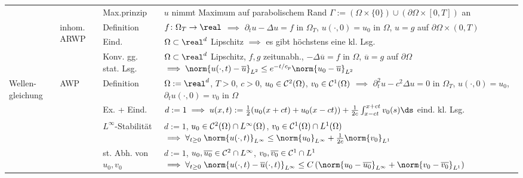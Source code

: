 \begin{landscape}
\begin{tabular}{p{20mm}p{20mm}p{30mm}p{169mm}}
        &&Max.prinzip&
        $u$ nimmt Maximum auf parabolischem Rand
        $\Gamma := (\Omega \times \{0\}) \cup (\partial\Omega \times [0, T])$ an\\

        \cmidrule{2-4}

        &\multirow{3}{20mm}{inhom. ARWP}&
        Definition&
        $f\colon \Omega_T \to \real$
        $\implies$
        $\partial_t u - \Delta u = f$ in $\Omega_T$,
        $u(\cdot, 0) = u_0$ in $\Omega$,
        $u = g$ auf $\partial\Omega \times (0, T)$\\

        &&Eind.&
        $\Omega \subset \real^d$ Lipschitz
        $\implies$ es gibt höchstens eine kl. Lsg.\\

        &&Konv. gg. stat. Lsg.&
        $\Omega \subset \real^d$ Lipschitz,
        $f, g$ zeitunabh.,
        $-\Delta\overline{u} = f$ in $\Omega$, $\overline{u} = g$ auf $\partial\Omega$
        $\implies \norm{u(\cdot, t) - \overline{u}}_{L^2} \le
        e^{-t/c_p} \norm{u_0 - \overline{u}}_{L^2}$\\

        \midrule

        \multirow{8}{20mm}{Wellen-gleichung}&
        \multirow{5}{20mm}{AWP}&
        Definition&
        $\Omega := \real^d$, $T > 0$, $c > 0$, $u_0 \in \mathcal{C}^2(\Omega)$, $v_0 \in \mathcal{C}^1(\Omega)$
        $\implies$
        $\partial_t^2 u - c^2 \Delta u = 0$ in $\Omega_T$, $u(\cdot, 0) = u_0$,
        $\partial_t u(\cdot, 0) = v_0$ in $\Omega$\\

        &&Ex. + Eind.&
        $d := 1 \implies u(x, t) :=
        \frac{1}{2} (u_0(x+ct) + u_0(x-ct)) + \frac{1}{2c} \int_{x-ct}^{x+ct} v_0(s)\ds$
        eind. kl. Lsg.\\

        &&$L^\infty$-Stabilität&
        $d := 1$, $u_0 \in \mathcal{C}^2(\Omega) \cap L^\infty(\Omega)$,
        $v_0 \in \mathcal{C}^1(\Omega) \cap L^1(\Omega)$
        $\implies
        \forall_{t \ge 0}\;
        \norm{u(\cdot, t)}_{L^\infty} \le \norm{u_0}_{L^\infty} +
        \frac{1}{2c} \norm{v_0}_{L^1}$\\

        &&st. Abh. von $u_0, v_0$&
        $d := 1$, $u_0, \overline{u_0} \in \mathcal{C}^2 \cap L^\infty$,
        $v_0, \overline{v_0} \in \mathcal{C}^1 \cap L^1$
        $\implies
        \forall_{t \ge 0}\;
        \norm{u(\cdot, t) - \overline{u}(\cdot, t)}_{L^\infty}
        \le C \left(\norm{u_0 - \overline{u_0}}_{L^\infty} +
        \norm{v_0 - \overline{v_0}}_{L^1}\right)$\\


\end{tabular}
\end{landscape}
